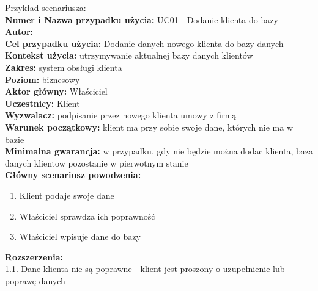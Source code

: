 Przykład scenariusza: \\
\textbf{Numer i Nazwa przypadku użycia:} UC01 - Dodanie klienta do bazy \\
\textbf{Autor:} \\
\textbf{Cel przypadku użycia:} Dodanie danych nowego klienta do bazy danych \\
\textbf{Kontekst użycia:} utrzymywanie aktualnej bazy danych klientów \\
\textbf{Zakres:} system obsługi klienta \\
\textbf{Poziom:} biznesowy \\
\textbf{Aktor główny:} Właściciel \\
\textbf{Uczestnicy:} Klient \\
\textbf{Wyzwalacz:} podpisanie przez nowego klienta umowy z firmą \\
\textbf{Warunek początkowy:} klient ma przy sobie swoje dane, których nie ma w bazie \\
\textbf{Minimalna gwarancja:} w przypadku, gdy nie będzie można dodac klienta, baza danych klientow pozostanie w pierwotnym stanie \\
\textbf{Główny scenariusz powodzenia:} 
	\begin{enumerate}
		\item Klient podaje swoje dane
		\item Właściciel sprawdza ich poprawność
		\item Właściciel wpisuje dane do bazy 
	\end{enumerate}
\textbf{Rozszerzenia:} \\
1.1. Dane klienta nie są poprawne - klient jest proszony o uzupełnienie lub poprawę danych
